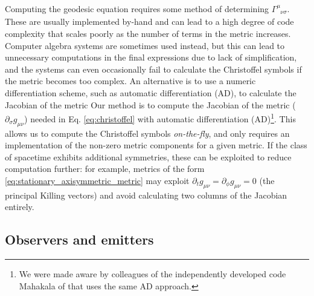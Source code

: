 \documentclass[fleqn,usenatbib]{mnras}
\newcommand{\utensor}[3]{#1^{#2}_{\phantom{#2}#3}}
\begin{document}
Computing the geodesic equation requires some method of determining
$\utensor{\Gamma}{\mu}{\nu\sigma}$.  These are usually implemented by-hand and
can lead to a high degree of code complexity that scales poorly as the number of
terms in the metric increases. Computer algebra systems are sometimes used
instead, but this can lead to unnecessary computations in the final expressions
due to lack of simplification, and the systems can even occasionally fail to
calculate the Christoffel symbols if the metric becomes too complex.  An
alternative is to use a numeric differentiation scheme, such as automatic
differentiation (AD), to calculate the Jacobian of the metric Our method is to
compute the Jacobian of the metric ($\partial_{\sigma} g_{\mu \nu}$) needed in
Eq.  \eqref{eq:christoffel} with automatic differentiation (AD)\footnote{We were
    made aware by colleagues of the independently developed code Mahakala of
    \citet{sharma_mahakala_2023} that uses the same AD approach.}.  This allows
    us to compute the Christoffel symbols \emph{on-the-fly}, and only requires
an implementation of the non-zero metric components for a given metric. If
the class of spacetime exhibits additional symmetries, these can be
exploited to reduce computation further: for example, metrics of the form
\eqref{eq:stationary_axisymmetric_metric} may exploit $\partial_t g_{\mu\nu} =
\partial_{\phi} g_{\mu\nu} = 0$ (the principal Killing vectors) and avoid
calculating two columns of the Jacobian entirely.

\subsection{Observers and emitters}
\label{sec:observers-and-emitters}
\end{document}
